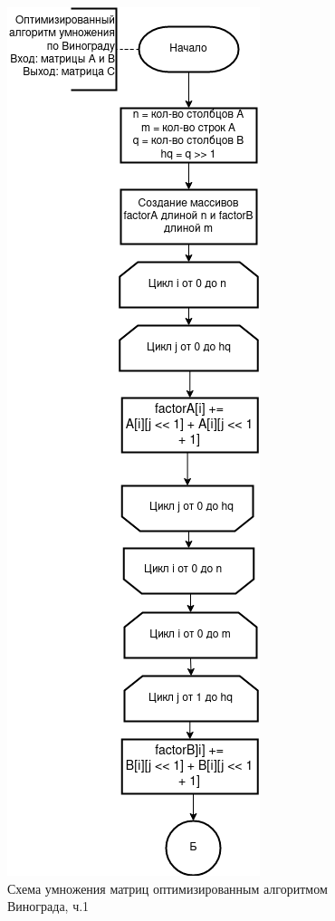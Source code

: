 \documentclass[12pt]{report}
\begin{document}
	\begin{figure}[H]
		\centering
		\includegraphics[width=0.38\linewidth]{opvin_1}
		\caption{Схема умножения матриц оптимизированным алгоритмом Винограда, ч.1}
		\label{fig:schema_selection}
	\end{figure}
	
\end{document}
